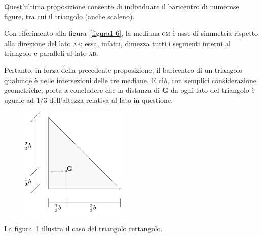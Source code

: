 \noindent Quest'ultima proposizione consente di individuare il baricentro di numerose figure, tra cui il triangolo (anche scaleno). 

\noindent Con riferimento alla figura~\ref{figura1-6}, la mediana \textsc{cm} è asse di simmetria rispetto alla direzione del lato \textsc{ab}: essa, infatti, dimezza tutti i segmenti interni al triangolo e paralleli al lato \textsc{ab}. 

\noindent Pertanto, in forza della precedente proposizione, il baricentro di un triangolo qualunqe è nelle intersezioni delle tre mediane. E ciò, con semplici considerazione geometriche, porta a concludere che la distanza di $\mathbf{G}$ da ogni lato del triangolo è uguale ad $1/3$ dell'altezza relativa al lato in questione. 
\renewcommand{\thefigure}{1~-~7}
\begin{figure}[h]
\centering
\includegraphics[width=0.45\textwidth]{Immagini/Parte_1/Figura1_7/Figura1_7.pdf}
\caption{}
\label{figura1-7}
\end{figure}
\noindent La figura~\ref{figura1-7} illustra il caso del triangolo rettangolo.

